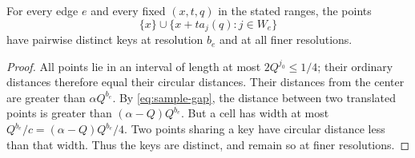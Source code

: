 \begin{lemma}\label{lem:separation}
For every edge $e$ and every fixed $(x,t,q)$ in the stated ranges, the
points
\[
 \{x\}\cup\{x+ta_j(q):j\in W_e\}
\]
have pairwise distinct keys at resolution $b_e$ and at all finer
resolutions.
\end{lemma}

\begin{proof}
All points lie in an interval of length at most $2Q^{j_0}\le1/4$;
their ordinary distances therefore equal their circular distances.
Their distances from the center are greater than $\alpha Q^{b_e}$.
By \eqref{eq:sample-gap}, the distance between two translated points
is greater than $(\alpha-Q)Q^{b_e}$. But a cell has width at most
$Q^{b_e}/c=(\alpha-Q)Q^{b_e}/4$. Two points sharing a key have circular
distance less than that width. Thus the keys are distinct, and remain
so at finer resolutions.
\end{proof}
